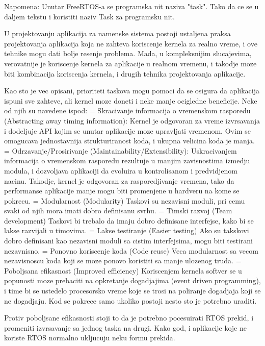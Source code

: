 \documentclass[a4paper,12pt, master]{etf}
\begin{document}
	Napomena: Unutar FreeRTOS-a se programska nit naziva "task". Tako da ce se u daljem tekstu i
	koristiti naziv Task za programsku nit.

	U projektovanju aplikacija za namenske sistema postoji ustaljena praksa projektovanja
	aplikacija koja ne zahteva koriscenje kernela za realno vreme, i ove tehnike mogu dati bolje
	resenje problema. Mada, u kompleksnijim slucajevima, verovatnije je koriscenje kernela za
	aplikacije u realnom vremenu, i takodje moze biti kombinacija koriscenja kernela, i drugih
	tehnika projektovanja aplikacije.

	Kao sto je vec opisani, prioriteti taskova mogu pomoci da se osigura da aplikacija ispuni sve
	zahteve, ali kernel moze doneti i neke manje ocigledne beneficije. Neke od njih su navedene
	ispod:
	= Skracivanje informacija o vremenskom rasporedu (Abstracting away timing information):
		Kernel je odgovoran za vreme izvrsavanja i dodeljuje API kojim se unutar aplikacije moze
		upravljati vremenom. Ovim se omogucava jednostavnija strukturiranost koda, i ukupna
		velicina koda je manja.
	= Odrzavanje/Prosirivanje (Maintainability/Extensibility):
		Uskracivanjem informacija o vremenskom rasporedu rezultuje u manjim zavisnostima izmedju
		modula, i dozvoljava aplikaciji da evoluira u kontrolisanom i predvidjenom nacinu. Takodje,
		kernel je odgovoran za rasporedjivanje vremena, tako da performanse aplikacije manje mogu
		biti promenjene u hardveru na kome se pokrecu.
	= Modularnost (Modularity)
		Taskovi su nezavisni moduli, pri cemu svaki od njih mora imati dobro definisanu svrhu.
	= Timski razvoj (Team development)
		Taskovi bi trebalo da imaju dobro definisane interfejse, kako bi se lakse razvijali u
		timovima.
	= Lakse testiranje (Easier testing)
		Ako su takskovi dobro definisani kao nezavisni moduli sa cistim interfejsima, mogu biti
		testirani nezavnisno.
	= Ponovno koriscenje koda (Code reuse)
		Veca modularnost sa vecom nezavisnoscu koda koji se moze ponovo koristiti sa manje ulozenog
		truda.
	= Poboljsana efikasnost (Improved efficiency)
		Koriscenjem kernela softver se u popunosti moze prebaciti na opkretanje dogadjajima (event
		driven programming), i time bi se ustedelo procesorsko vreme koje se trosi na poliranje
		dogadjaja koji se ne dogadjaju. Kod se pokrece samo ukoliko postoji nesto sto je potrebno
		uraditi.

		Protiv poboljsane efikasnosti stoji to da je potrebno pocesuirati RTOS prekid, i promeniti
		izvrsavanje sa jednog taska na drugi. Kako god, i aplikacije koje ne koriste RTOS normalno
		ukljucuju neku formu prekida.
\end{document}
